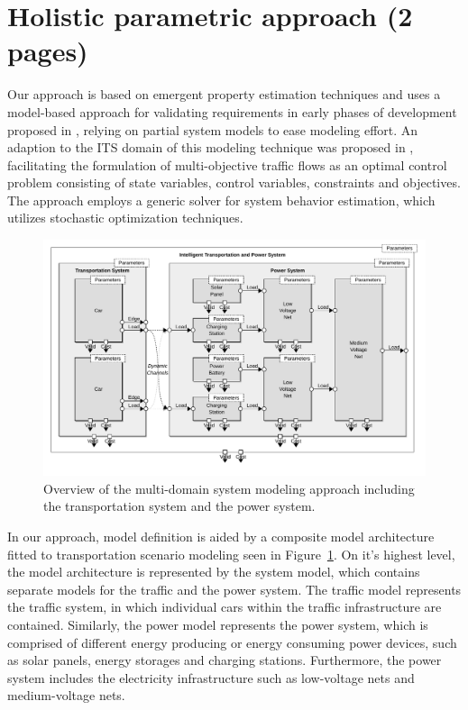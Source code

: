 \section{Holistic parametric approach (2 pages)}
\label{section:contribution_1}

Our approach is based on emergent property estimation techniques \cite{hackenberg2012towards} and uses a model-based approach for validating requirements in early phases of development proposed in \cite{hackenberg2014rapid}, relying on partial system models to ease modeling effort. An adaption to the ITS domain of this modeling technique was proposed in \cite{ascher2014early}, facilitating the formulation of multi-objective traffic flows as an optimal control problem consisting of state variables, control variables, constraints and objectives. The approach employs a generic solver for system behavior estimation, which utilizes stochastic optimization techniques.

\begin{figure}[h]
	\centering
	\includegraphics[width=\textwidth]{../gfx/model2.pdf}
	\caption{Overview of the multi-domain system modeling approach including the transportation system and the power system.}
	\label{fig:model}
\end{figure}

In our approach, model definition is aided by a composite model architecture fitted to transportation scenario modeling seen in Figure~\ref{fig:model}. On it's highest level, the model architecture is represented by the system model, which contains separate models for the traffic and the power system. The traffic model represents the traffic system, in which individual cars within the traffic infrastructure are contained. Similarly, the power model represents the power system, which is comprised of different energy producing or energy consuming power devices, such as solar panels, energy storages and charging stations. Furthermore, the power system includes the electricity infrastructure such as low-voltage nets and medium-voltage nets.

